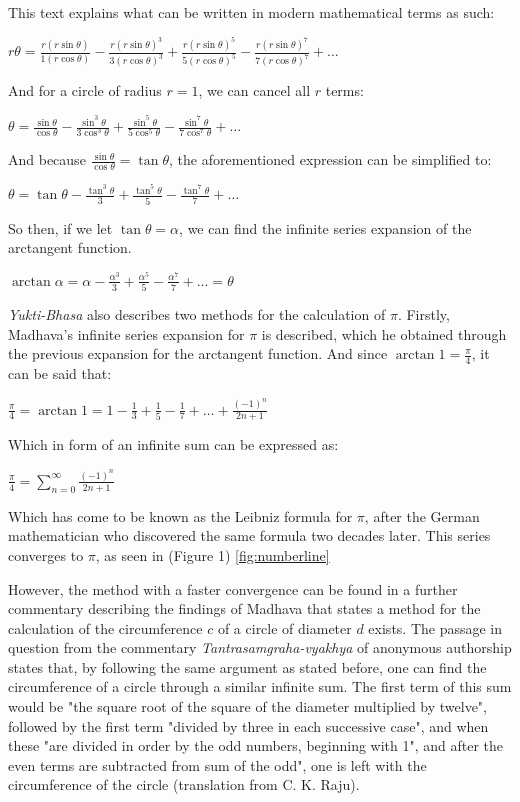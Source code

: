 

This text explains what can be written in modern mathematical terms as such:

$r \theta = \frac{r (r \sin{\theta})}{1 (r \cos{\theta})} - \frac{r (r \sin{\theta})^3}{3 (r \cos{\theta})^3} + \frac{r (r \sin{\theta})^5}{5 (r \cos{\theta})^5} - \frac{r (r \sin{\theta})^7}{7 (r \cos{\theta})^7} + \dots$

And for a circle of radius $r = 1$, we can cancel all $r$ terms:

$\theta = \frac{\sin{\theta}}{\cos{\theta}} - \frac{\sin^3{\theta}}{3 \cos^3{\theta}} + \frac{\sin^5{\theta}}{5 \cos^5{\theta}} - \frac{\sin^7{\theta}}{7 \cos^7{\theta}} + \dots$

And because $\frac{\sin{\theta}}{\cos{\theta}} = \tan{\theta}$, the aforementioned expression
can be simplified to:

$\theta = \tan{\theta} - \frac{\tan^3{\theta}}{3} + \frac{\tan^5{\theta}}{5} - \frac{\tan^7{\theta}}{7} + \dots$

So then, if we let $\tan{\theta} = \alpha$, we can find the infinite series expansion
of the arctangent function.

$\arctan{\alpha} = \alpha - \frac{\alpha^3}{3} + \frac{\alpha^5}{5} - \frac{\alpha^7}{7} + \dots = \theta$

\textit{Yukti-Bhasa} also describes two methods for the calculation of $\pi$. Firstly,
Madhava's infinite series expansion for $\pi$ is described, which he obtained through
the previous expansion for the arctangent function. And since $\arctan{1} = \frac{\pi}{4}$,
it can be said that:

$\frac{\pi}{4} = \arctan{1} = 1 - \frac{1}{3} + \frac{1}{5} - \frac{1}{7} + \dots + \frac{(-1)^n}{2n +1}$

Which in form of an infinite sum can be expressed as:

$\frac{\pi}{4} = \sum\limits_{n=0}^\infty \frac{(-1)^n}{2n +1}$

Which has come to be known as the Leibniz formula for $\pi$, after the German mathematician
who discovered the same formula two decades later. \cite{edwards_1994} This series converges to $\pi$, as seen in (Figure 1) \ref{fig:numberline}


However, the method with a faster convergence can be found in a further commentary describing the findings of Madhava that states
a method for the calculation of the circumference $c$ of a circle of diameter $d$ exists.
The passage in question from the commentary \textit{Tantrasamgraha-vyakhya} of
anonymous authorship states that, by following the same argument as stated before, one
can find the circumference of a circle through a similar infinite sum. The first
term of this sum would be "the square root of the square of the diameter multiplied by
twelve", followed by the first term "divided by three in each successive case", and
when these "are divided in order by the odd numbers, beginning with 1", and after the
even terms are subtracted from sum of the odd", one is left with the circumference of the
circle (translation from C. K. Raju). \cite{raju_2007}

